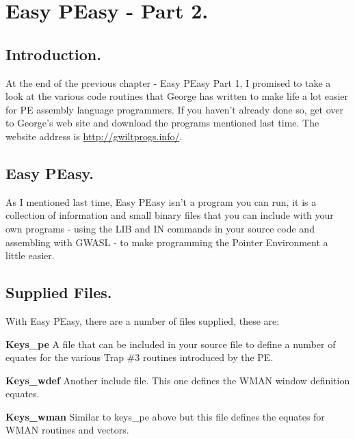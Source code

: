 \chapter{Easy PEasy -{} Part 2.}

\section{Introduction.}
\label{ch26-intro}%

At the end of the previous chapter -{} Easy PEasy Part 1, I promised to take a look
        at the various code routines that George has written to make life a lot easier for
        PE assembly language programmers. If you haven't already done so, get over to
        George's web site and download the programs mentioned last time. The website
        address is \url{http://gwiltprogs.info/}.

\section{Easy PEasy.}
\label{ch26-easy-peasy}%

As I mentioned last time, Easy PEasy isn't a program you can run, it is a
        collection of information and small binary files that you can include with your
        own programs -{} using the LIB and IN commands in your source code and assembling
        with GWASL -{} to make programming the Pointer
        Environment a little easier.

\section{Supplied Files.}
\label{ch26-files-supplied}%

With Easy PEasy, there are a number of files supplied, these are:

{\bf Keys\_pe} 
A file that can be included in your source file to define a number of
            equates for the various Trap \#3 routines introduced by the PE.

{\bf Keys\_wdef} 
Another include file. This one defines the WMAN window definition
            equates.

{\bf Keys\_wman} 
Similar to keys\_pe above but this file defines the
            equates for WMAN routines and vectors.

